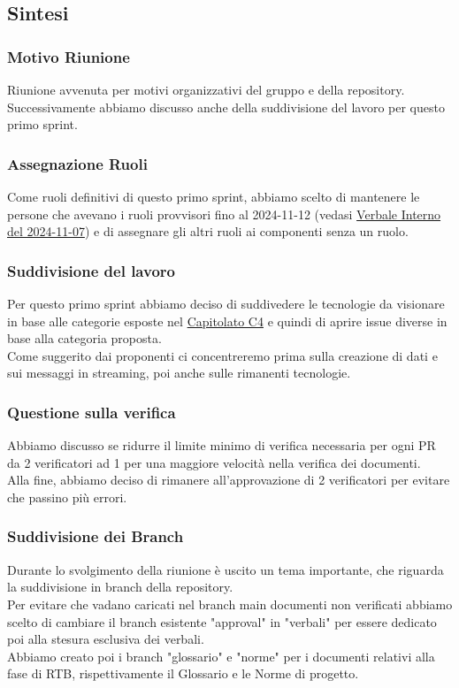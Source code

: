 \documentclass[10pt]{article}
\begin{document}
\subsection{Sintesi}
\subsubsection{Motivo Riunione}
Riunione avvenuta per motivi organizzativi del gruppo e della repository.\\ Successivamente abbiamo discusso anche della suddivisione del lavoro per questo primo sprint.

\subsubsection{Assegnazione Ruoli}
Come ruoli definitivi di questo primo sprint, abbiamo scelto di mantenere le persone che avevano i ruoli provvisori fino al 2024-11-12 (vedasi \href{https://sevenbitsswe.github.io/7BitsDocs/VerbaleInterno-2024-11-07.pdf}{Verbale Interno del 2024-11-07}) e di assegnare gli altri ruoli ai componenti senza un ruolo.

\subsubsection{Suddivisione del lavoro}
Per questo primo sprint abbiamo deciso di suddivedere le tecnologie da visionare in base alle categorie esposte nel \href{https://www.math.unipd.it/~tullio/IS-1/2024/Progetto/C4.pdf}{Capitolato C4} e quindi di aprire issue diverse in base alla categoria proposta.\\ 
Come suggerito dai proponenti ci concentreremo prima sulla creazione di dati e sui messaggi in streaming, poi anche sulle rimanenti tecnologie.

\subsubsection{Questione sulla verifica}
Abbiamo discusso se ridurre il limite minimo di verifica necessaria per ogni PR da 2 verificatori ad 1 per una maggiore velocità nella verifica dei documenti.\\
Alla fine, abbiamo deciso di rimanere all'approvazione di 2 verificatori per evitare che passino più errori.

\subsubsection{Suddivisione dei Branch}
Durante lo svolgimento della riunione è uscito un tema importante, che riguarda la suddivisione in branch della repository.\\
Per evitare che vadano caricati nel branch main documenti non verificati abbiamo scelto di cambiare il branch esistente "approval" in "verbali" per essere dedicato poi alla stesura esclusiva dei verbali.\\
Abbiamo creato poi i branch "glossario" e "norme" per i documenti relativi alla fase di RTB, rispettivamente il Glossario e le Norme di progetto.
\end{document}

